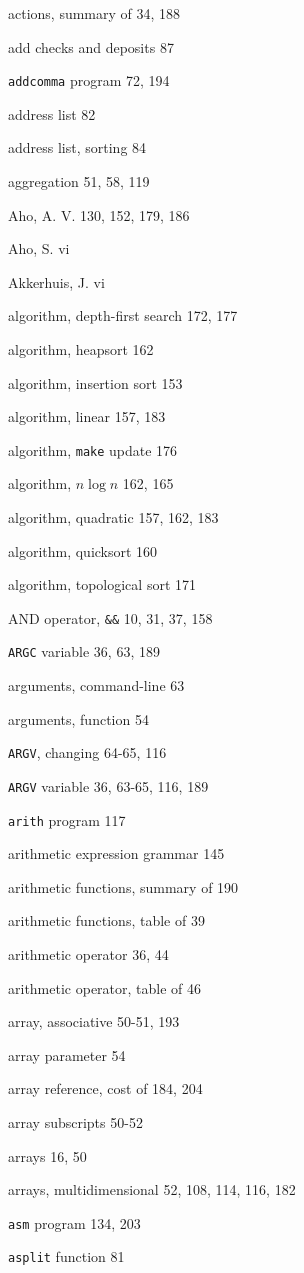 \begin{multicols}{3}
actions, summary of 34, 188

add checks and deposits 87

\verb'addcomma' program 72, 194

address list 82

address list, sorting 84

aggregation 51, 58, 119

Aho, A. V. 130, 152, 179, 186

Aho, S. vi

Akkerhuis, J. vi

algorithm, depth-first search 172, 177

algorithm, heapsort 162

algorithm, insertion sort 153

algorithm, linear 157, 183

algorithm, \verb'make' update 176

algorithm, $n\log n$ 162, 165

algorithm, quadratic 157, 162, 183

algorithm, quicksort 160

algorithm, topological sort 171

AND operator, \verb'&&' 10, 31, 37, 158

\verb'ARGC' variable 36, 63, 189

arguments, command-line 63

arguments, function 54

\verb'ARGV', changing 64-65, 116

\verb'ARGV' variable 36, 63-65, 116, 189

\verb'arith' program 117

arithmetic expression grammar 145

arithmetic functions, summary of 190

arithmetic functions, table of 39

arithmetic operator 36, 44

arithmetic operator, table of 46

array, associative 50-51, 193

array parameter 54

array reference, cost of 184, 204

array subscripts 50-52

arrays 16, 50

arrays, multidimensional 52, 108, 114, 116, 182

\verb'asm' program 134, 203

\verb'asplit' function 81


\end{multicols}
